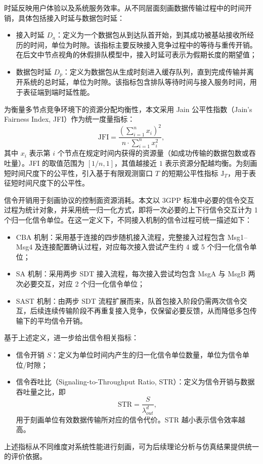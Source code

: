 时延反映用户体验以及系统服务效率。从不同层面刻画数据传输过程中的时间开销，具体包括接入时延与数据包时延：
\begin{itemize}
	\item 接入时延 $D_a$：定义为一个数据包从到达队首开始，到其成功被基站接收所经历的时间，单位为时隙。该指标主要反映接入竞争过程中的等待与重传开销。在后文中节点视角的休假排队模型中，接入时延可表示为假期长度的期望值；
	
	\item 数据包时延 $D_p$：定义为数据包从生成时刻进入缓存队列，直到完成传输并离开系统的总时延，单位为时隙。该指标包含排队等待时间与接入服务时间，用于表征端到端时延性能。
\end{itemize}

为衡量多节点竞争环境下的资源分配均衡性，本文采用 Jain 公平性指数（Jain's Fairness Index, JFI）作为统一度量指标：
\begin{equation}
\text{JFI} = \frac{\left(\sum_{i=1}^{n} x_i\right)^2}{n \cdot \sum_{i=1}^{n} x_i^2},
\end{equation}
其中 $x_i$ 表示第 $i$ 个节点在规定时间内获得的资源量（如成功传输的数据包数或吞吐量）。JFI 的取值范围为 $[1/n, 1]$，其值越接近 $1$ 表示资源分配越均衡。为刻画短时间尺度下的公平性，引入基于有限观测窗口 $T$ 的短期公平性指标 $\mathrm{J}_T$，用于表征短时间尺度下的公平性。


信令开销用于刻画协议的控制面资源消耗。本文以 3GPP 标准中必要的信令交互过程为统计对象，并采用统一归一化方式，即将一次必要的上下行信令交互计为 1 个归一化信令单位。在这一定义下，不同接入机制的信令过程可统一描述如下：
\begin{itemize}
\item CBA 机制：采用基于连接的四步随机接入流程，完整接入过程包含 Msg1--Msg4 及连接配置确认过程，对应每次接入尝试产生约 4 或 5 个归一化信令单位；

\item SA 机制：采用两步 SDT 接入流程，每次接入尝试均包含 MsgA 与 MsgB 两次必要交互，对应 2 个归一化信令单位；

\item SAST 机制：由两步 SDT 流程扩展而来，队首包接入阶段仍需两次信令交互，后续连续传输阶段不再重复接入竞争，仅保留必要反馈，从而降低多包传输下的平均信令开销。

\end{itemize}
基于上述定义，进一步给出信令相关指标：
\begin{itemize}
\item 信令开销 $S$：定义为单位时间内产生的归一化信令单位数量，单位为信令单位/时隙；

\item 信令吞吐比（Signaling-to-Throughput Ratio, STR）：定义为信令开销与数据吞吐量之比，即
\begin{equation}
\mathrm{STR} = \frac{S}{\lambda^d_{out}},
\end{equation}
用于刻画单位有效数据传输所对应的信令代价。STR 越小表示信令效率越高。
\end{itemize}
上述指标从不同维度对系统性能进行刻画，可为后续理论分析与仿真结果提供统一的评价依据。

